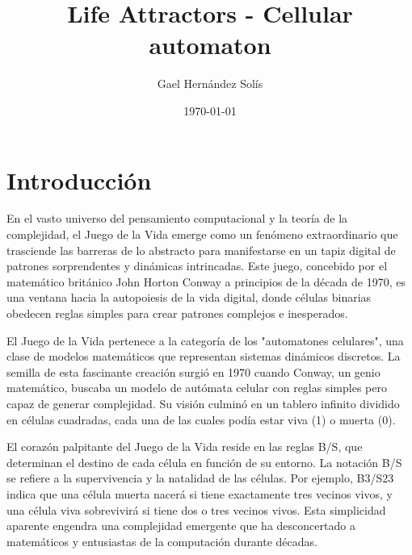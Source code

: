 \documentclass{article}
\title{Life Attractors - Cellular automaton}
\author{Gael Hernández Solís}
\date{\today}
\begin{document}
	\begin{titlepage}
		\maketitle
	\end{titlepage}
	
	\newpage 
	
	\pagestyle{fancy}
	\lhead{}
	\chead{}
	\rhead{}
	\lfoot{}
	\cfoot{\thepage}
	\rfoot{}
	
	\tableofcontents 
	
	\newpage 
	
	
	\renewcommand{\cftsecfont}{\normalfont}
	\renewcommand{\cftsubsecfont}{\normalfont\itshape}
	\renewcommand{\cftsecleader}{\cftdotfill{\cftdotsep}}
	\renewcommand{\cftsubsecleader}{\cftdotfill{\cftdotsep}}
	\addtocontents{toc}{\protect\renewcommand{\protect\cftsecleader}{\protect\cftdotfill{\protect\cftdotsep}}}
	
	\section{Introducción}
	
	En el vasto universo del pensamiento computacional y la teoría de la complejidad, el Juego de la Vida emerge como un fenómeno extraordinario que trasciende las barreras de lo abstracto para manifestarse en un tapiz digital de patrones sorprendentes y dinámicas intrincadas. Este juego, concebido por el matemático británico John Horton Conway a principios de la década de 1970, es una ventana hacia la autopoiesis de la vida digital, donde células binarias obedecen reglas simples para crear patrones complejos e inesperados.
	
	El Juego de la Vida pertenece a la categoría de los "automatones celulares", una clase de modelos matemáticos que representan sistemas dinámicos discretos. La semilla de esta fascinante creación surgió en 1970 cuando Conway, un genio matemático, buscaba un modelo de autómata celular con reglas simples pero capaz de generar complejidad. Su visión culminó en un tablero infinito dividido en células cuadradas, cada una de las cuales podía estar viva (1) o muerta (0).
	
	El corazón palpitante del Juego de la Vida reside en las reglas B/S, que determinan el destino de cada célula en función de su entorno. La notación B/S se refiere a la supervivencia y la natalidad de las células. Por ejemplo, B3/S23 indica que una célula muerta nacerá si tiene exactamente tres vecinos vivos, y una célula viva sobrevivirá si tiene dos o tres vecinos vivos. Esta simplicidad aparente engendra una complejidad emergente que ha desconcertado a matemáticos y entusiastas de la computación durante décadas.
	
\end{document}
